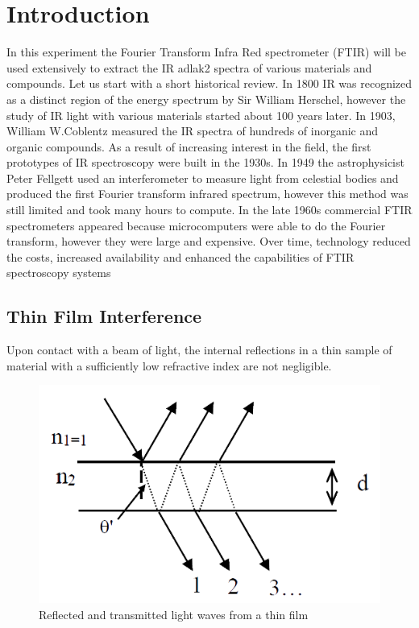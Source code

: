 \documentclass[reprint,amsmath,amssymb,aps, prl]{revtex4-2}
\begin{document}
\section{Introduction}
In this experiment the Fourier Transform Infra Red spectrometer (FTIR) will be used extensively to extract the IR adlak2
spectra of various materials and compounds. 
Let us start with a short historical review.
In 1800 IR was recognized as a distinct region of the energy spectrum by Sir William Herschel, however the study of IR light with various materials started about 100 years later. In 1903, William W.Coblentz measured the IR spectra of hundreds of inorganic and organic compounds.
As a result of increasing interest in the field, the first prototypes of IR spectroscopy were built in the 1930s.  In 1949 the astrophysicist Peter Fellgett used an interferometer to measure light from celestial bodies and produced the first Fourier transform infrared spectrum, however this method was still limited and took many hours to compute. In the late 1960s commercial FTIR spectrometers appeared because
microcomputers were able to do the Fourier transform, however
they were large and expensive. Over time, technology reduced the costs,
increased availability and enhanced the capabilities of FTIR spectroscopy systems\cite{spechistory}


\subsection{Thin Film Interference}
Upon contact with a beam of light, the internal reflections in a thin sample of material with a sufficiently low refractive index are not negligible.
\begin{figure}[h]
    \includegraphics[width=\linewidth]{Images/Thin film.png}
    \caption{Reflected and transmitted light waves from a thin film}
    \label{fig:ThinFilm}
\end{figure}
\end{document}
